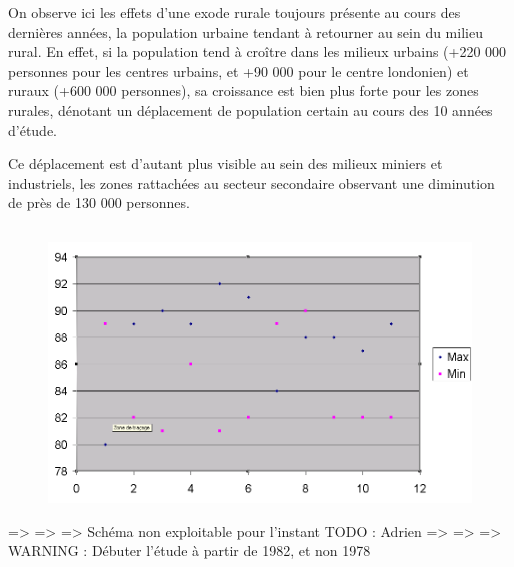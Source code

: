On observe ici les effets d'une exode rurale toujours présente au cours des dernières années, la population urbaine tendant à retourner au sein du milieu rural. En effet, si la population tend à croître dans les milieux urbains (+220 000 personnes pour les centres urbains, et +90 000 pour le centre londonien) et ruraux (+600 000 personnes), sa croissance est bien plus forte pour les zones rurales, dénotant un déplacement de population certain au cours des 10 années d'étude.

Ce déplacement est d'autant plus visible au sein des milieux miniers et industriels, les zones rattachées au secteur secondaire observant une diminution de près de 130 000 personnes.
\pagebreak


\subsection{}
\begin{figure}[h!]
    \centering
    \includegraphics[width=\linewidth]{images/pop/anneeMinMax(TODO).png}
\end{figure}
=> => => Schéma non exploitable pour l'instant
TODO : Adrien
=> => => WARNING : Débuter l'étude à partir de 1982, et non 1978
